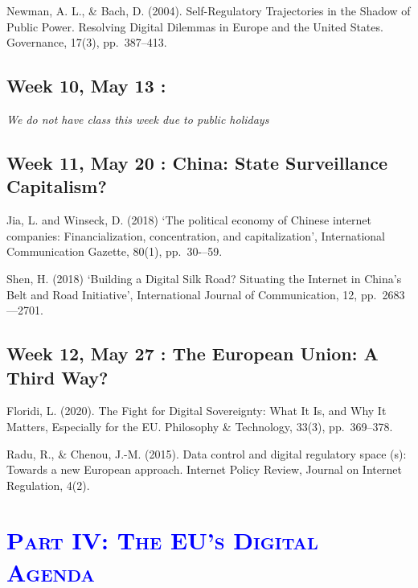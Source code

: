 \documentclass[12pt,]{article}
\begin{document}
Newman, A. L., \& Bach, D. (2004). Self-Regulatory Trajectories in the
Shadow of Public Power. Resolving Digital Dilemmas in Europe and the
United States. Governance, 17(3), pp.~387--413.

\hypertarget{week-10-may-13}{%
\subsection{Week 10, May 13 :}\label{week-10-may-13}}

\emph{We do not have class this week due to public holidays}

\hypertarget{week-11-may-20-china-state-surveillance-capitalism}{%
\subsection{Week 11, May 20 : China: State Surveillance
Capitalism?}\label{week-11-may-20-china-state-surveillance-capitalism}}

Jia, L. and Winseck, D. (2018) `The political economy of Chinese
internet companies: Financialization, concentration, and
capitalization', International Communication Gazette, 80(1),
pp.~30-\/--59.

Shen, H. (2018) `Building a Digital Silk Road? Situating the Internet in
China's Belt and Road Initiative', International Journal of
Communication, 12, pp.~2683---2701.

\hypertarget{week-12-may-27-the-european-union-a-third-way}{%
\subsection{Week 12, May 27 : The European Union: A Third
Way?}\label{week-12-may-27-the-european-union-a-third-way}}

Floridi, L. (2020). The Fight for Digital Sovereignty: What It Is, and
Why It Matters, Especially for the EU. Philosophy \& Technology, 33(3),
pp.~369--378.

Radu, R., \& Chenou, J.-M. (2015). Data control and digital regulatory
space (s): Towards a new European approach. Internet Policy Review,
Journal on Internet Regulation, 4(2).

\hypertarget{section-3}{%
\section{\texorpdfstring{\textcolor{Blue}{\textsc{Part IV: The EU's Digital Agenda}}}{}}\label{section-3}}

\vspace{0.5cm}
\end{document}

